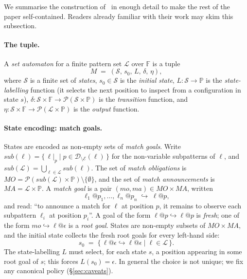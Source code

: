 \documentclass[11pt]{article}
\theoremstyle{plain}
\theoremstyle{definition}
\theoremstyle{remark}
\newcommand{\Pos}{\mathbb{P}}
\newcommand{\States}{\mathcal{S}}
\newcommand{\Lhs}{\mathcal{L}}
\newcommand{\dom}{\mathcal{D}}
\newcommand{\edges}{\mathcal{E}}
\begin{document}
We summarise the construction of~\cite{BouwmanErkens2022,ErkensGroote2021}
in enough detail to make the rest of the paper self-contained. Readers
already familiar with their work may skim this subsection.

\paragraph{The tuple.}
A \emph{set automaton} for a finite pattern set $\Lhs$ over
$\mathbb{F}$ is a tuple
\[
  M \;=\; (\States,\, s_{0},\, L,\, \delta,\, \eta),
\]
where $\States$ is a finite set of \emph{states}, $s_{0} \in \States$
is the \emph{initial state}, $L : \States \to \Pos$ is the
\emph{state-labelling} function (it selects the next position to
inspect from a configuration in state $s$),
$\delta : \States \times \mathbb{F} \to \mathcal{P}(\States \times \Pos)$
is the \emph{transition} function, and $\eta : \States \times \mathbb{F}
\to \mathcal{P}(\Lhs \times \Pos)$ is the \emph{output} function.

\paragraph{State encoding: match goals.}
States are encoded as non-empty sets of \emph{match goals}. Write
$\mathit{sub}(\ell) = \{\, \ell|_{p} \mid p \in
\dom_{\setminus\edges}(\ell) \,\}$ for the non-variable subpatterns of
$\ell$, and $\mathit{sub}(\Lhs) = \bigcup_{\ell \in \Lhs}
\mathit{sub}(\ell)$. The set of \emph{match obligations} is
$\mathit{MO} = \mathcal{P}(\mathit{sub}(\Lhs) \times \Pos) \setminus
\{\emptyset\}$, and the set of \emph{match announcements} is
$\mathit{MA} = \Lhs \times \Pos$. A \emph{match goal} is a pair
$(\mathit{mo}, \mathit{ma}) \in \mathit{MO} \times \mathit{MA}$, written
\[
  \ell_{1}@p_{1}, \ldots, \ell_{n}@p_{n} \;\hookrightarrow\; \ell@p,
\]
and read: ``to announce a match for $\ell$ at position $p$, it remains
to observe each subpattern $\ell_{i}$ at position $p_{i}$''. A goal of
the form $\ell@p \hookrightarrow \ell@p$ is \emph{fresh}; one of the form
$\mathit{mo} \hookrightarrow \ell@\epsilon$ is a \emph{root goal}. States
are non-empty subsets of $\mathit{MO} \times \mathit{MA}$, and the
initial state collects the fresh root goals for every left-hand side:
\[
  s_{0} \;=\; \{\, \ell@\epsilon \hookrightarrow \ell@\epsilon \mid \ell \in \Lhs \,\}.
\]
The state-labelling $L$ must select, for each state $s$, a position
appearing in some root goal of $s$; this forces $L(s_{0}) = \epsilon$.
In general the choice is not unique; we fix any canonical policy
(\S\ref{sec:caveats}).
\end{document}
